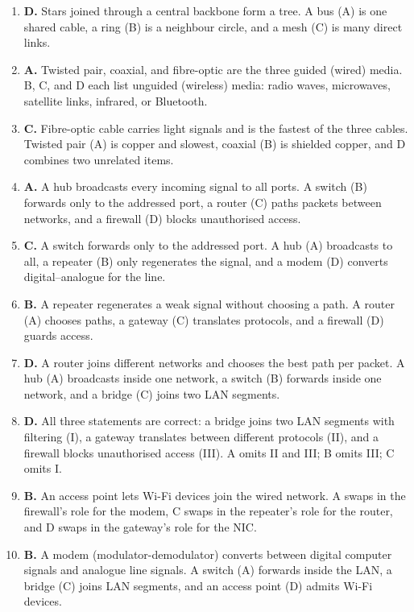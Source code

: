 \documentclass[11pt]{article}
\begin{document}
\begin{enumerate}[label=\textbf{Q\arabic*.}, leftmargin=*]
  its many direct links. A bus (A) is cheapest, a star (B) uses one centre,
  and a ring (D) is a single circle.
\item \textbf{D.} Stars joined through a central backbone form a tree. A bus
  (A) is one shared cable, a ring (B) is a neighbour circle, and a mesh (C)
  is many direct links.
\item \textbf{A.} Twisted pair, coaxial, and fibre-optic are the three guided
  (wired) media. B, C, and D each list unguided (wireless) media: radio
  waves, microwaves, satellite links, infrared, or Bluetooth.
\item \textbf{C.} Fibre-optic cable carries light signals and is the fastest
  of the three cables. Twisted pair (A) is copper and slowest, coaxial (B) is
  shielded copper, and D combines two unrelated items.
\item \textbf{A.} A hub broadcasts every incoming signal to all ports. A
  switch (B) forwards only to the addressed port, a router (C) paths packets
  between networks, and a firewall (D) blocks unauthorised access.
\item \textbf{C.} A switch forwards only to the addressed port. A hub (A)
  broadcasts to all, a repeater (B) only regenerates the signal, and a modem
  (D) converts digital--analogue for the line.
\item \textbf{B.} A repeater regenerates a weak signal without choosing a
  path. A router (A) chooses paths, a gateway (C) translates protocols, and
  a firewall (D) guards access.
\item \textbf{D.} A router joins different networks and chooses the best
  path per packet. A hub (A) broadcasts inside one network, a switch (B)
  forwards inside one network, and a bridge (C) joins two LAN segments.
\item \textbf{D.} All three statements are correct: a bridge joins two LAN
  segments with filtering (I), a gateway translates between different
  protocols (II), and a firewall blocks unauthorised access (III). A omits
  II and III; B omits III; C omits I.
\item \textbf{B.} An access point lets Wi-Fi devices join the wired network.
  A swaps in the firewall's role for the modem, C swaps in the repeater's
  role for the router, and D swaps in the gateway's role for the NIC.
\item \textbf{B.} A modem (modulator-demodulator) converts between digital
  computer signals and analogue line signals. A switch (A) forwards inside
  the LAN, a bridge (C) joins LAN segments, and an access point (D) admits
  Wi-Fi devices.


\end{enumerate}
\end{document}
